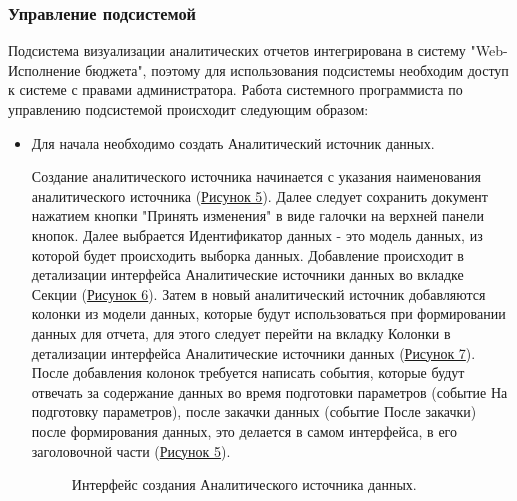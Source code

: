 \documentclass[a4paper]{extarticle}
\begin{document}
\subsubsection{Управление подсистемой}
Подсистема визуализации аналитических отчетов интегрирована в систему "Web-Исполнение бюджета", поэтому для использования подсистемы необходим доступ к системе с правами администратора. Работа системного программиста по управлению подсистемой происходит следующим образом:
\begin{itemize}
	\item Для начала необходимо создать Аналитический источник данных.\par
	Создание аналитического источника начинается с указания наименования аналитического источника (\hyperref[ris3_1]{Рисунок 5}). Далее следует сохранить документ нажатием кнопки "Принять изменения" в виде галочки на верхней панели кнопок. Далее выбрается Идентификатор данных - это модель данных, из которой будет происходить выборка данных. Добавление происходит в детализации интерфейса Аналитические источники данных во вкладке Секции (\hyperref[ris3_2]{Рисунок 6}). Затем в новый аналитический источник добавляются колонки из модели данных, которые будут использоваться при формировании данных для отчета, для этого следует перейти на вкладку Колонки в детализации интерфейса Аналитические источники данных (\hyperref[ris3_3]{Рисунок 7}). После добавления колонок требуется написать события, которые будут отвечать за содержание данных во время подготовки параметров (событие На подготовку параметров), после закачки данных (событие После закачки) после формирования данных, это делается в самом интерфейса, в его заголовочной части (\hyperref[ris3_1]{Рисунок 5}).
\begin{figure}[H]
\caption{Интерфейс создания Аналитического источника данных.}
\label{ris3_1}
\end{figure}\par
\begin{figure}[H]

\end{figure}
\end{itemize}
\end{document}
